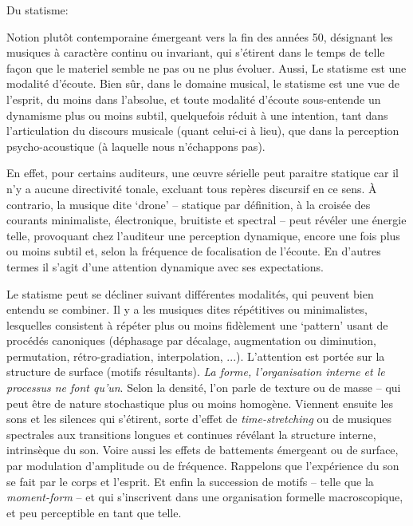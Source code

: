 \documentclass{article}
\begin{document}
%
%
%

\bigskip

Du statisme:

\smallskip 

\noindent Notion plutôt contemporaine émergeant vers la fin des années 50, désignant les musiques à caractère continu ou invariant, qui s'étirent dans le temps de telle façon que le materiel semble ne pas ou ne plus évoluer.  Aussi, Le statisme est une modalité d'écoute. 
Bien sûr, dans le domaine musical, le statisme est une vue de l'esprit, du moins dans l'absolue, et toute modalité d'écoute sous-entende un dynamisme plus ou moins subtil, quelquefois réduit à une intention, tant dans l'articulation du discours musicale (quant celui-ci à lieu), que dans la perception psycho-acoustique (à laquelle nous n'échappons pas).

En effet, pour certains auditeurs, une œuvre sérielle peut paraitre statique car il n'y a aucune directivité tonale, excluant tous repères discursif en ce sens. À contrario, la musique dite `drone'  -- statique par définition, à la croisée des courants minimaliste, électronique, bruitiste et spectral -- peut révéler une énergie telle, provoquant chez l'auditeur une perception dynamique, encore une fois plus ou moins subtil et, selon la fréquence de focalisation de l'écoute. En d'autres termes il s'agit d'une attention dynamique avec ses expectations.


Le statisme peut se décliner suivant différentes modalités, qui peuvent bien entendu se combiner. Il y a les musiques dites répétitives ou minimalistes, lesquelles consistent à répéter plus ou moins fidèlement une `pattern' usant de procédés canoniques (déphasage par décalage, augmentation ou diminution, permutation, rétro-gradiation, interpolation, ...). L'attention est portée sur la structure de surface (motifs résultants). \textit{La  forme, l'organisation interne et le processus ne font qu'un}. Selon la densité, l'on parle de texture ou de masse -- qui peut être de nature stochastique plus ou moins homogène. Viennent ensuite les sons et les silences qui s'étirent, sorte d'effet de \textit{time-stretching} ou de musiques spectrales aux transitions longues et continues révélant la structure interne, intrinsèque du son. Voire aussi les effets de battements émergeant ou de surface, par modulation d'amplitude ou de fréquence. Rappelons que l'expérience du son se fait par le corps et l'esprit. Et enfin la succession de motifs -- telle que la \textit{moment-form} -- et qui s'inscrivent dans une organisation formelle macroscopique, et peu perceptible en tant que telle.
\end{document}

